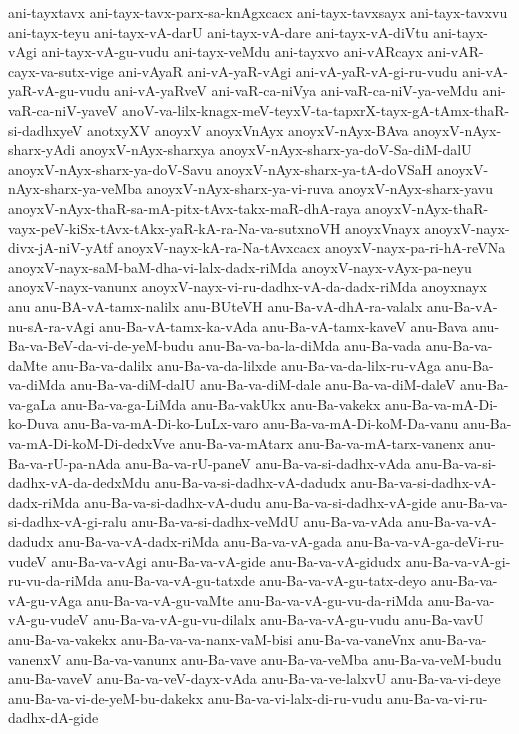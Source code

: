 {ani-tayxtavx
ani-tayx-tavx-parx-sa-knAgxcacx
ani-tayx-tavxsayx
ani-tayx-tavxvu
ani-tayx-teyu
ani-tayx-vA-darU
ani-tayx-vA-dare
ani-tayx-vA-diVtu
ani-tayx-vAgi
ani-tayx-vA-gu-vudu
ani-tayx-veMdu
ani-tayxvo
ani-vARcayx
ani-vAR-cayx-va-sutx-vige
ani-vAyaR
ani-vA-yaR-vAgi
ani-vA-yaR-vA-gi-ru-vudu
ani-vA-yaR-vA-gu-vudu
ani-vA-yaRveV
ani-vaR-ca-niVya
ani-vaR-ca-niV-ya-veMdu
ani-vaR-ca-niV-yaveV
anoV-va-lilx-knagx-meV-teyxV-ta-tapxrX-tayx-gA-tAmx-thaR-si-dadhxyeV
anotxyXV
anoyxV
anoyxVnAyx
anoyxV-nAyx-BAva
anoyxV-nAyx-sharx-yAdi
anoyxV-nAyx-sharxya
anoyxV-nAyx-sharx-ya-doV-Sa-diM-dalU
anoyxV-nAyx-sharx-ya-doV-Savu
anoyxV-nAyx-sharx-ya-tA-doVSaH
anoyxV-nAyx-sharx-ya-veMba
anoyxV-nAyx-sharx-ya-vi-ruva
anoyxV-nAyx-sharx-yavu
anoyxV-nAyx-thaR-sa-mA-pitx-tAvx-takx-maR-dhA-raya
anoyxV-nAyx-thaR-vayx-peV-kiSx-tAvx-tAkx-yaR-kA-ra-Na-va-sutxnoVH
anoyxVnayx
anoyxV-nayx-divx-jA-niV-yAtf
anoyxV-nayx-kA-ra-Na-tAvxcacx
anoyxV-nayx-pa-ri-hA-reVNa
anoyxV-nayx-saM-baM-dha-vi-lalx-dadx-riMda
anoyxV-nayx-vAyx-pa-neyu
anoyxV-nayx-vanunx
anoyxV-nayx-vi-ru-dadhx-vA-da-dadx-riMda
anoyxnayx
anu
anu-BA-vA-tamx-nalilx
anu-BUteVH
anu-Ba-vA-dhA-ra-valalx
anu-Ba-vA-nu-sA-ra-vAgi
anu-Ba-vA-tamx-ka-vAda
anu-Ba-vA-tamx-kaveV
anu-Bava
anu-Ba-va-BeV-da-vi-de-yeM-budu
anu-Ba-va-ba-la-diMda
anu-Ba-vada
anu-Ba-va-daMte
anu-Ba-va-dalilx
anu-Ba-va-da-lilxde
anu-Ba-va-da-lilx-ru-vAga
anu-Ba-va-diMda
anu-Ba-va-diM-dalU
anu-Ba-va-diM-dale
anu-Ba-va-diM-daleV
anu-Ba-va-gaLa
anu-Ba-va-ga-LiMda
anu-Ba-vakUkx
anu-Ba-vakekx
anu-Ba-va-mA-Di-ko-Duva
anu-Ba-va-mA-Di-ko-LuLx-varo
anu-Ba-va-mA-Di-koM-Da-vanu
anu-Ba-va-mA-Di-koM-Di-dedxVve
anu-Ba-va-mAtarx
anu-Ba-va-mA-tarx-vanenx
anu-Ba-va-rU-pa-nAda
anu-Ba-va-rU-paneV
anu-Ba-va-si-dadhx-vAda
anu-Ba-va-si-dadhx-vA-da-dedxMdu
anu-Ba-va-si-dadhx-vA-dadudx
anu-Ba-va-si-dadhx-vA-dadx-riMda
anu-Ba-va-si-dadhx-vA-dudu
anu-Ba-va-si-dadhx-vA-gide
anu-Ba-va-si-dadhx-vA-gi-ralu
anu-Ba-va-si-dadhx-veMdU
anu-Ba-va-vAda
anu-Ba-va-vA-dadudx
anu-Ba-va-vA-dadx-riMda
anu-Ba-va-vA-gada
anu-Ba-va-vA-ga-deVi-ru-vudeV
anu-Ba-va-vAgi
anu-Ba-va-vA-gide
anu-Ba-va-vA-gidudx
anu-Ba-va-vA-gi-ru-vu-da-riMda
anu-Ba-va-vA-gu-tatxde
anu-Ba-va-vA-gu-tatx-deyo
anu-Ba-va-vA-gu-vAga
anu-Ba-va-vA-gu-vaMte
anu-Ba-va-vA-gu-vu-da-riMda
anu-Ba-va-vA-gu-vudeV
anu-Ba-va-vA-gu-vu-dilalx
anu-Ba-va-vA-gu-vudu
anu-Ba-vavU
anu-Ba-va-vakekx
anu-Ba-va-va-nanx-vaM-bisi
anu-Ba-va-vaneVnx
anu-Ba-va-vanenxV
anu-Ba-va-vanunx
anu-Ba-vave
anu-Ba-va-veMba
anu-Ba-va-veM-budu
anu-Ba-vaveV
anu-Ba-va-veV-dayx-vAda
anu-Ba-va-ve-lalxvU
anu-Ba-va-vi-deye
anu-Ba-va-vi-de-yeM-bu-dakekx
anu-Ba-va-vi-lalx-di-ru-vudu
anu-Ba-va-vi-ru-dadhx-dA-gide
}
